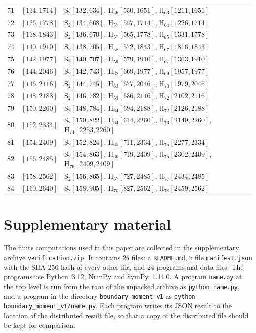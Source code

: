 \documentclass{amsart}
\newcommand{\file}[1]{\nolinkurl{#1}}
\theoremstyle{definition}
\theoremstyle{remark}
\numberwithin{equation}{section}
\begin{document}
{\begin{longtable}{rrp{}}
71&$[134,1714]$&$\mathrm{S}_{2}[132,634]$, $\mathrm{H}_{56}[550,1651]$, $\mathrm{H}_{63}[1211,1651]$\\
72&$[136,1778]$&$\mathrm{S}_{2}[134,668]$, $\mathrm{H}_{57}[557,1714]$, $\mathrm{H}_{64}[1226,1714]$\\
73&$[138,1843]$&$\mathrm{S}_{2}[136,670]$, $\mathrm{H}_{57}[565,1778]$, $\mathrm{H}_{65}[1331,1778]$\\
74&$[140,1910]$&$\mathrm{S}_{2}[138,705]$, $\mathrm{H}_{58}[572,1843]$, $\mathrm{H}_{67}[1816,1843]$\\
75&$[142,1977]$&$\mathrm{S}_{2}[140,707]$, $\mathrm{H}_{59}[579,1910]$, $\mathrm{H}_{67}[1363,1910]$\\
76&$[144,2046]$&$\mathrm{S}_{2}[142,743]$, $\mathrm{H}_{62}[669,1977]$, $\mathrm{H}_{69}[1957,1977]$\\
77&$[146,2116]$&$\mathrm{S}_{2}[144,745]$, $\mathrm{H}_{63}[677,2046]$, $\mathrm{H}_{70}[1979,2046]$\\
78&$[148,2188]$&$\mathrm{S}_{2}[146,782]$, $\mathrm{H}_{63}[686,2116]$, $\mathrm{H}_{72}[2102,2116]$\\
79&$[150,2260]$&$\mathrm{S}_{2}[148,784]$, $\mathrm{H}_{64}[694,2188]$, $\mathrm{H}_{72}[2126,2188]$\\
80&$[152,2334]$&$\mathrm{S}_{2}[150,822]$, $\mathrm{H}_{64}[614,2260]$, $\mathrm{H}_{73}[2149,2260]$, $\mathrm{H}_{74}[2253,2260]$\\
81&$[154,2409]$&$\mathrm{S}_{2}[152,824]$, $\mathrm{H}_{65}[711,2334]$, $\mathrm{H}_{75}[2277,2334]$\\
82&$[156,2485]$&$\mathrm{S}_{2}[154,863]$, $\mathrm{H}_{66}[719,2409]$, $\mathrm{H}_{75}[2302,2409]$, $\mathrm{H}_{76}[2409,2409]$\\
83&$[158,2562]$&$\mathrm{S}_{2}[156,865]$, $\mathrm{H}_{67}[727,2485]$, $\mathrm{H}_{77}[2434,2485]$\\
84&$[160,2640]$&$\mathrm{S}_{2}[158,905]$, $\mathrm{H}_{70}[827,2562]$, $\mathrm{H}_{78}[2459,2562]$\\
\end{longtable}}

\section{Supplementary material}\label{app:data}
The finite computations used in this paper are collected in the supplementary archive
\file{verification.zip}. It contains $26$ files: a \file{README.md}, a file
\file{manifest.json} with the SHA-256 hash of every other file, and $24$ programs and
data files. The programs use Python~3.12, NumPy and SymPy~1.14.0. A program
\file{name.py} at the top level is run from the root of the unpacked archive as
\texttt{python name.py}, and a program in the directory \file{boundary_moment_v1} as
\texttt{python boundary\_moment\_v1/name.py}. Each program writes its JSON result to the
location of the distributed result file, so that a copy of the distributed file should be
kept for comparison.
\end{document}
